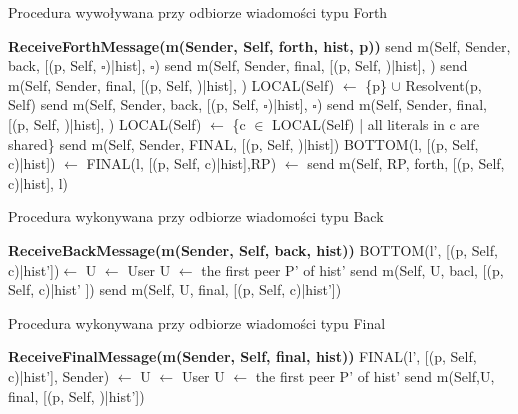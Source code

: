 \documentclass[a4paper,12pt]{mwart}
\begin{document}
\begin{algorithm}[H]
\caption{Procedura wywoływana przy odbiorze wiadomości typu Forth}
\begin{algorithmic}
\STATE \textbf{ReceiveForthMessage(m(Sender, Self, forth, hist, p))}
\STATE send m(Self, Sender, back, [(p, Self, $\square$)|hist], $\square$)
\STATE send m(Self, Sender, final, [(p, Self, \TRUE)|hist], \TRUE)
\STATE send m(Self, Sender, final, [(p, Self, \TRUE)|hist], \TRUE)
\ELSE
\STATE LOCAL(Self) $\leftarrow$ \{p\} $\cup$ Resolvent(p, Self)
\STATE send m(Self, Sender, back, [(p, Self, $\square$)|hist], $\square$)
\STATE send m(Self, Sender, final, [(p, Self, \TRUE)|hist], \TRUE)
\ELSE
\STATE LOCAL(Self) $\leftarrow$ \{c $\in$ LOCAL(Self) | all literals in c are shared\}
\STATE send m(Self, Sender, FINAL, [(p, Self, \TRUE)|hist])
\ENDIF
{}
\STATE BOTTOM(l, [(p, Self, c)|hist]) $\leftarrow$ \FALSE
{}
\STATE FINAL(l, [(p, Self, c)|hist],RP) $\leftarrow$ \FALSE
\STATE send m(Self, RP, forth, [(p, Self, c)|hist], l)
\ENDFOR
\ENDFOR
\ENDFOR
\ENDIF
\ENDIF
\end{algorithmic}
\end{algorithm}
\begin{algorithm}[H]
\caption{Procedura wykonywana przy odbiorze wiadomości typu Back}
\begin{algorithmic}
\STATE \textbf{ReceiveBackMessage(m(Sender, Self, back, hist))}
\STATE {}
\STATE BOTTOM(l', [(p, Self, c)|hist'])$\leftarrow$ \TRUE
{}
\STATE U $\leftarrow$ User 
\ELSE
\STATE U $\leftarrow$ the first peer P' of hist' 
\ENDIF
\STATE send m(Self, U, bacl, [(p, Self, c)|hist' ])
\STATE send m(Self, U, final, [(p, Self, c)|hist'])
\ENDIF
\end{algorithmic}
\end{algorithm}
\begin{algorithm}[H]
\caption{Procedura wykonywana przy odbiorze wiadomości typu Final}
\begin{algorithmic}
\STATE \textbf{ReceiveFinalMessage(m(Sender, Self, final, hist))}
\STATE {}
\STATE FINAL(l', [(p, Self, c)|hist'], Sender) $\leftarrow$ \TRUE
{}
\STATE U $\leftarrow$ User 
\ELSE
\STATE U $\leftarrow$ the first peer P' of hist' 
\ENDIF
\ENDIF
\STATE send m(Self,U, final, [(p, Self, \TRUE)|hist']) 
\end{algorithmic}
\end{algorithm}
\end{document}
